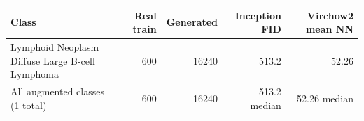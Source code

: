 \begin{tabularx}{\linewidth}{@{}>{\raggedright\arraybackslash}Xrrrr@{}}
\toprule
Class & Real train & Generated & Inception FID & Virchow2 mean NN\\
\midrule
Lymphoid Neoplasm Diffuse Large B-cell Lymphoma & \num{600} & \num{16240} & \num{513.2} & \num{52.26}\\
\midrule
All augmented classes (1 total) & \num{600} & \num{16240} & \num{513.2} median & \num{52.26} median\\
\bottomrule
\end{tabularx}
